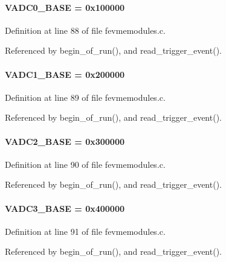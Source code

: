 \paragraph[{VADC0\_\-BASE}]{ {\bf VADC0\_\-BASE} = 0x100000}\hfill\label{fevmemodules_8c_a3ae5fa9db7b26822330dc4ecd93bced4}


Definition at line 88 of file fevmemodules.c.

Referenced by begin\_\-of\_\-run(), and read\_\-trigger\_\-event().
\paragraph[{VADC1\_\-BASE}]{ {\bf VADC1\_\-BASE} = 0x200000}\hfill\label{fevmemodules_8c_aadd77a29826b8161d9b96c579eb2d263}


Definition at line 89 of file fevmemodules.c.

Referenced by begin\_\-of\_\-run(), and read\_\-trigger\_\-event().
\paragraph[{VADC2\_\-BASE}]{ {\bf VADC2\_\-BASE} = 0x300000}\hfill\label{fevmemodules_8c_a041d0b7085ddc2d50f0c554de93ab39d}


Definition at line 90 of file fevmemodules.c.

Referenced by begin\_\-of\_\-run(), and read\_\-trigger\_\-event().
\paragraph[{VADC3\_\-BASE}]{ {\bf VADC3\_\-BASE} = 0x400000}\hfill\label{fevmemodules_8c_a37ab9af0533e181c4729f7705c4a993e}


Definition at line 91 of file fevmemodules.c.

Referenced by begin\_\-of\_\-run(), and read\_\-trigger\_\-event().

